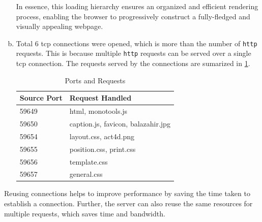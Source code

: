 \begin{enumerate}[a. ]
        In essence, this loading hierarchy ensures an organized and efficient rendering process, enabling the browser to progressively construct a fully-fledged and visually appealing webpage.
    \item Total 6 tcp connections were opened, which is more than the number of {\tt http} requests. This is because multiple {\tt http} requests can be served over a single tcp connection. The requests served by the connections are sumarized in \cref{tab:pnr}.
    \begin{table}[!ht]
        \centering
        \begin{tabular}{|l|l|}
        \hline
        \textbf{Source Port} & \textbf{Request Handled}           \\ \hline
        59649                & html, monotools.js                 \\ \hline
        59650                & caption.js, favicon, balazahir.jpg \\ \hline
        59654                & layout.css, act4d.png              \\ \hline
        59655                & position.css, print.css            \\ \hline
        59656                & template.css                       \\ \hline
        59657                & general.css                        \\ \hline
        \end{tabular}
        \caption{Ports and Requests}
        \label{tab:pnr}
        \end{table}
\end{enumerate}
Reusing connections helps to improve performance by saving the time taken to establish a connection. Further, the server can also reuse the same resources for multiple requests, which saves time and bandwidth.